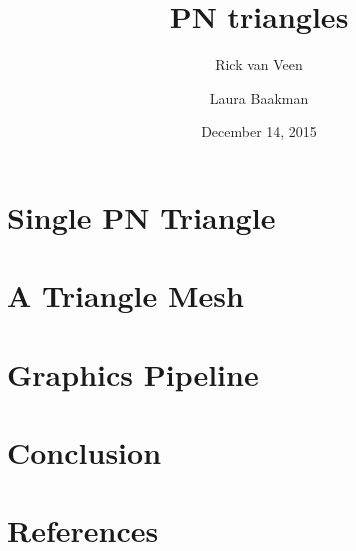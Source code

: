 \documentclass[13pt]{beamer}
\title{PN triangles}
\author{Rick van Veen \and Laura Baakman}
\date{December 14, 2015}
\institute{Advanced Computer Graphics}
\begin{document}
	\begin{frame}
		\titlepage
	\end{frame}

	

	\section{Single PN Triangle}
	

	\section{A Triangle Mesh}
	

	\section{Graphics Pipeline}
	

	\section{Conclusion}
	

	\section{References}
	
\end{document}
